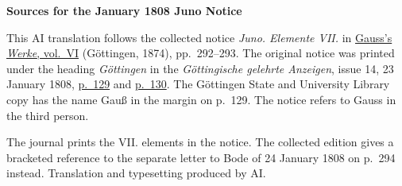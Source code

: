 \clearpage\thispagestyle{empty}
\begin{center}\textbf{Sources for the January 1808 Juno Notice}\end{center}
\noindent This AI translation follows the collected notice \textit{Juno. Elemente VII.} in \href{https://gdz.sub.uni-goettingen.de/id/PPN236007467}{Gauss’s \textit{Werke}, vol.~VI} (Göttingen, 1874), pp.~292--293. The original notice was printed under the heading \textit{Göttingen} in the \textit{Göttingische gelehrte Anzeigen}, issue 14, 23 January 1808, \href{https://manifests.sub.uni-goettingen.de/iiif/image/gdz:PPN319721507_1808:00000131/full/1600,/0/default.jpg}{p.~129} and \href{https://manifests.sub.uni-goettingen.de/iiif/image/gdz:PPN319721507_1808:00000132/full/1600,/0/default.jpg}{p.~130}. The Göttingen State and University Library copy has the name Gauß in the margin on p.~129. The notice refers to Gauss in the third person.
\par\medskip
The journal prints the VII. elements in the notice. The collected edition gives a bracketed reference to the separate letter to Bode of 24 January 1808 on p.~294 instead. Translation and typesetting produced by AI.
\clearpage
